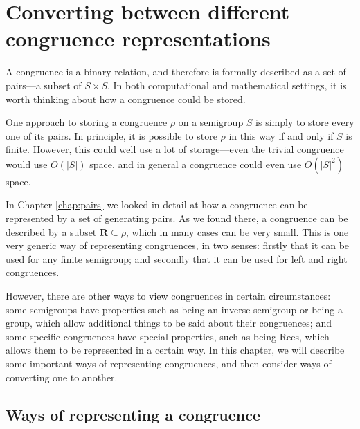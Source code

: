\chapter{Converting between different congruence representations}
\label{chap:converting}

A congruence is a binary relation, and therefore is formally described as a set
of pairs---a subset of $S \times S$.  In both computational and mathematical
settings, it is worth thinking about how a congruence could be stored.

One approach to storing a congruence $\rho$ on a semigroup $S$ is simply to
store every one of its pairs.  In principle, it is possible to store
$\rho$ in this way if and only if $S$ is finite.  However, this could well use a
lot of storage---even the trivial congruence would use $O(|S|)$ space, and in
general a congruence could even use $O(|S|^2)$ space.

In Chapter \ref{chap:pairs} we looked in detail at how a congruence can be
represented by a set of generating pairs.  As we found there, a congruence can
be described by a subset $\mathbf{R} \subseteq \rho$, which in many cases can be
very small.  This is one very generic way of representing congruences, in two
senses: firstly that it can be used for any finite semigroup; and secondly that
it can be used for left and right congruences.

However, there are other ways to view congruences in certain circumstances: some
semigroups have properties such as being an inverse semigroup or being a group,
which allow additional things to be said about their congruences; and some
specific congruences have special properties, such as being Rees, which allows
them to be represented in a certain way.  In this chapter, we will describe
some important ways of representing congruences, and then consider ways of
converting one to another.

\section{Ways of representing a congruence}
\label{sec:ways-of-representing}

